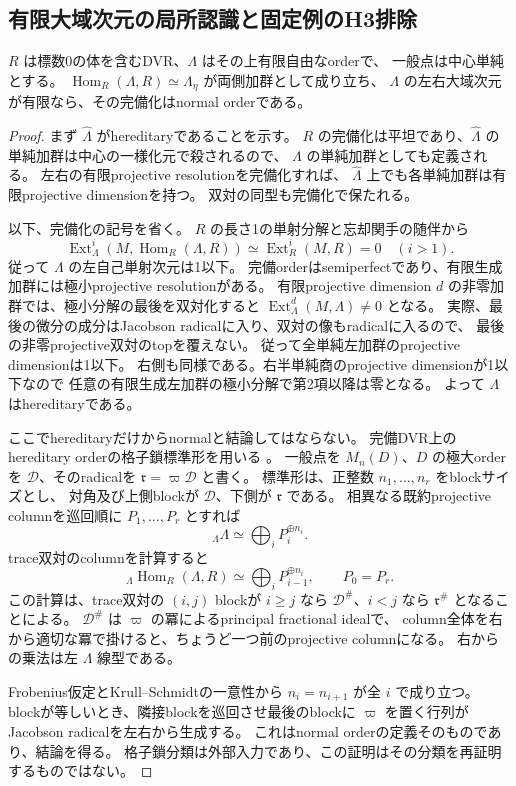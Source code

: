 \subsection{有限大域次元の局所認識と固定例のH3排除}
\label{subsec:cubic-third-root-unit-boundary-L-order-obstruction}
\begin{lemma}
\label{lem:cubic-Frobenius-order-hereditary}
$R$ は標数0の体を含むDVR、$\Lambda$ はその上有限自由なorderで、
一般点は中心単純とする。
$\operatorname{Hom}_R(\Lambda,R)\simeq\Lambda_\eta$ が両側加群として成り立ち、
$\Lambda$ の左右大域次元が有限なら、その完備化はnormal orderである。
\end{lemma}
\begin{proof}
まず $\widehat\Lambda$ がhereditaryであることを示す。
$R$ の完備化は平坦であり、$\widehat\Lambda$ の単純加群は中心の一様化元で殺されるので、
$\Lambda$ の単純加群としても定義される。
左右の有限projective resolutionを完備化すれば、
$\widehat\Lambda$ 上でも各単純加群は有限projective dimensionを持つ。
双対の同型も完備化で保たれる。

以下、完備化の記号を省く。
$R$ の長さ1の単射分解と忘却関手の随伴から
\[
 \operatorname{Ext}^i_\Lambda
 (M,\operatorname{Hom}_R(\Lambda,R))
 \simeq\operatorname{Ext}^i_R(M,R)=0\quad(i>1).
\]
従って $\Lambda$ の左自己単射次元は1以下。
完備orderはsemiperfectであり、有限生成加群には極小projective resolutionがある。
有限projective dimension $d$ の非零加群では、極小分解の最後を双対化すると
$\operatorname{Ext}^d_\Lambda(M,\Lambda)\ne0$ となる。
実際、最後の微分の成分はJacobson radicalに入り、双対の像もradicalに入るので、
最後の非零projective双対のtopを覆えない。
従って全単純左加群のprojective dimensionは1以下。
右側も同様である。右半単純商のprojective dimensionが1以下なので
任意の有限生成左加群の極小分解で第2項以降は零となる。
よって $\Lambda$ はhereditaryである。

ここでhereditaryだけからnormalと結論してはならない。
完備DVR上のhereditary orderの格子鎖標準形を用いる
\cite[Theorem~21.5.1, Sections~21.3.1, 21.5.3, Remark~21.2.8]{VoightOrders}。
一般点を $M_n(D)$、$D$ の極大orderを $\mathcal D$、そのradicalを
$\mathfrak r=\varpi\mathcal D$ と書く。
標準形は、正整数 $n_1,\ldots,n_r$ をblockサイズとし、
対角及び上側blockが $\mathcal D$、下側が $\mathfrak r$ である。
相異なる既約projective columnを巡回順に $P_1,\ldots,P_r$ とすれば
\[
 {}_\Lambda\Lambda\simeq\bigoplus_i P_i^{\oplus n_i}.
\]
trace双対のcolumnを計算すると
\[
 {}_\Lambda\operatorname{Hom}_R(\Lambda,R)
 \simeq\bigoplus_i P_{i-1}^{\oplus n_i},\qquad P_0=P_r.
\]
この計算は、trace双対の $(i,j)$ blockが
$i\geq j$ なら $\mathcal D^\#$、$i<j$ なら $\mathfrak r^\#$ となることによる。
$\mathcal D^\#$ は $\varpi$ の冪によるprincipal fractional idealで、
column全体を右から適切な冪で掛けると、ちょうど一つ前のprojective columnになる。
右からの乗法は左 $\Lambda$ 線型である。

Frobenius仮定とKrull--Schmidtの一意性から $n_i=n_{i+1}$ が全 $i$ で成り立つ。
blockが等しいとき、隣接blockを巡回させ最後のblockに $\varpi$ を置く行列が
Jacobson radicalを左右から生成する。
これはnormal orderの定義そのものであり、結論を得る。
格子鎖分類は外部入力であり、この証明はその分類を再証明するものではない。
\end{proof}

